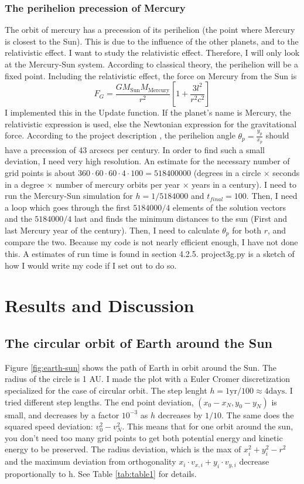 \documentclass{article}
\begin{document}
\subsubsection{The perihelion precession of Mercury}
The orbit of mercury has a precession of its perihelion (the point where Mercury is closest to the Sun). This is due to the influence of the other planets, and to the relativistic effect. I want to study the relativistic effect. Therefore, I will only look at the Mercury-Sun system. According to classical theory, the perihelion will be a fixed point. Including the relativistic effect, the force on Mercury from the Sun is
\[
F_G = \frac{GM_\mathrm{Sun}M_\mathrm{Mercury}}{r^2}\left[1 + \frac{3l^2}{r^2c^2}\right]
\]
I implemented this in the Update function. If the planet's name is Mercury, the relativistic expression is used, else the Newtonian expression for the gravitational force. According to the project description \cite{Projectdescription}, the perihelion angle $\theta_p = \frac{y_p}{x_p}$ should have a precession of 43 arcsecs per century. In order to find such a small deviation, I need very high resolution. An estimate for the necessary number of grid points is about $360\cdot 60\cdot 60\cdot 4\cdot 100 = 518400000$ (degrees in a circle $\times$ seconds in a degree $\times$ number of mercury orbits per year $\times$ years in a century). I need to run the Mercury-Sun simulation for $h=1/5184000$ and $t_{final}=100$. Then, I need a loop which goes through the first $5184000/4$ elements of the solution vectors and the $5184000/4$ last and finds the minimum distances to the sun (First and last Mercury year of the century). Then, I need to calculate $\theta_p$ for both $r$, and compare the two. Because my code is not nearly efficient enough, I have not done this. A estimates of run time is found in section 4.2.5. project3g.py is a sketch of how I would write my code if I set out to do so. 
\section{Results and Discussion}
\subsection{The circular orbit of Earth around the Sun}
Figure \ref{fig:earth-sun} shows the path of Earth in orbit around the Sun. The radius of the circle is 1 AU. I made the plot with a Euler Cromer discretization specialized for the case of circular orbit. The step lenght $h=1\textrm{yr}/100 \approx 4 \textrm{days}$. I tried different step lengths. The end point deviation, $(x_0-x_N,y_0-y_N)$ is small, and decreases by a factor $10^{-3}$ as $h$ decreases by $1/10$. The same does the squared speed deviation: $v_0^2-v_N^2$. This means that for one orbit around the sun, you don't need too many grid points to get both potential energy and kinetic energy to be preserved. The radius deviation, which is the max of $x_i^2 +y_i^2-r^2$ and the maximum deviation from orthogonality $x_i\cdot v_{x,i}+y_i \cdot v_{y,i}$ decrease proportionally to h. See Table \ref{tab:table1} for details.
\end{document}

